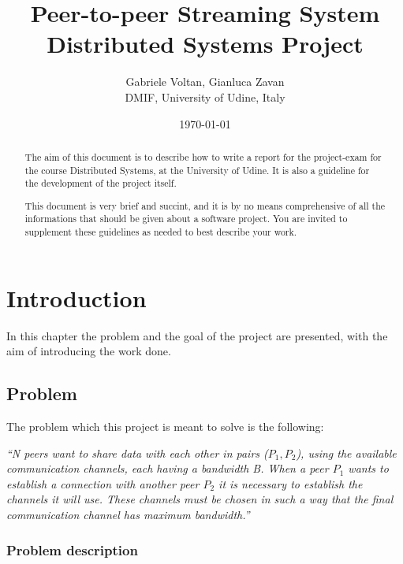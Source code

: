 \documentclass{memoir}
\title{Peer-to-peer Streaming System\\Distributed Systems Project}
\author{Gabriele Voltan, Gianluca Zavan\\ DMIF, University of Udine, Italy}
\date{\today}
\begin{document}
\maketitle
\begin{abstract}
The aim of this document is to describe how to write a report for the project-exam for the course Distributed Systems, at the University of Udine.
It is also a guideline for the development of the project itself.

This document is very brief and succint, and it is by no means comprehensive of all the informations that should be given about a software project. You are invited to supplement these guidelines as needed to best describe your work.
\end{abstract}

\chapter{Introduction}\label{ch:intro}
In this chapter the problem and the goal of the project are presented, with the aim of introducing the work done. 

\section{Problem}
The problem which this project is meant to solve is the following:

\noindent \textit{“N peers want to share data with each other in pairs ($P_1, P_2$), using the available communication channels, each having a bandwidth B. When a peer $P_1$ wants to establish a connection with another peer $P_2$ it is necessary to establish the channels it will use. These channels must be chosen in such a way that the final communication channel has maximum bandwidth.”}

\subsection{Problem description}
\end{document}
